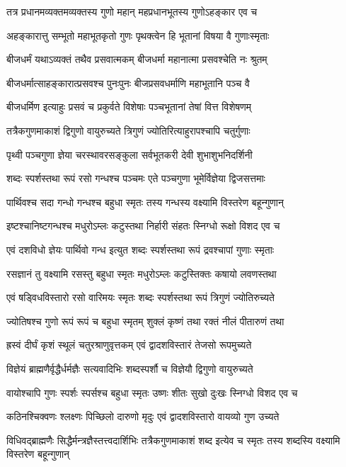 \twolineshloka
{तत्र प्रधानमव्यक्तमव्यक्तस्य गुणो महान्}
{महप्रधानभूतस्य गुणोऽहङ्कार एव च}


\twolineshloka
{अहङ्कारात्तु सम्भूतो महाभूतकृतो गुणः}
{पृथक्त्वेन हि भूतानां विषया वै गुणाःस्मृताः}


\twolineshloka
{बीजधर्मं यथाऽव्यक्तं तथैव प्रसवात्मकम्}
{बीजधर्मा महानात्मा प्रसवश्चेति नः श्रुतम्}


\twolineshloka
{बीजधर्मात्साहङ्कारात्प्रसवश्च पुनःपुनः}
{बीजप्रसवधर्माणि महाभूतानि पञ्च वै}


\twolineshloka
{बीजधर्मिण इत्याहुः प्रसवं च प्रकुर्वते}
{विशेषाः पञ्चभूतानां तेषां वित्त विशेषणम्}


\twolineshloka
{तत्रैकगुणमाकाशं द्विगुणो वायुरुच्यते}
{त्रिगुणं ज्योतिरित्याहुरापश्चापि चतुर्गुणाः}


\twolineshloka
{पृथ्वी पञ्चगुणा ज्ञेया चरस्थावरसङ्कुला}
{सर्वभूतकरी देवी शुभाशुभनिदर्शिनी}


\twolineshloka
{शब्दः स्पर्शस्तथा रूपं रसो गन्धश्च पञ्चमः}
{एते पञ्चगुणा भूमेर्विज्ञेया द्विजसत्तमाः}


\twolineshloka
{पार्थिवश्च सदा गन्धो गन्धश्च बहुधा स्मृतः}
{तस्य गन्धस्य वक्ष्यामि विस्तरेण बहून्गुणान्}


\twolineshloka
{इष्टश्चानिष्टगन्धश्च मधुरोऽम्लः कटुस्तथा}
{निर्हारी संहतः स्निग्धो रूक्षो विशद एव च}


\twolineshloka
{एवं दशविधो ज्ञेयः पार्थिवो गन्ध इत्युत}
{शब्दः स्पर्शस्तथा रूपं द्रवश्चापां गुणाः स्मृताः}


\twolineshloka
{रसज्ञानं तु वक्ष्यामि रसस्तु बहुधा स्मृतः}
{मधुरोऽम्लः कटुस्तिक्तः कषायो लवणस्तथा}


\twolineshloka
{एवं षड्विधविस्तारो रसो वारिमयः स्मृतः}
{शब्दः स्पर्शस्तथा रूपं त्रिगुणं ज्योतिरुच्यते}


\twolineshloka
{ज्योतिषश्च गुणो रूपं रूपं च बहुधा स्मृतम्}
{शुक्लं कृष्णं तथा रक्तं नीलं पीतारुणं तथा}


\twolineshloka
{ह्रस्वं दीर्घं कृशं स्थूलं चतुरश्राणुवृत्तकम्}
{एवं द्वादशविस्तारं तेजसो रूपमुच्यते}


\twolineshloka
{विज्ञेयं ब्राह्मणैर्वृद्धैर्धर्मज्ञैः सत्यवादिभिः}
{शब्दस्पर्शौ च विज्ञेयौ द्विगुणो वायुरुच्यते}


\twolineshloka
{वायोश्चापि गुणः स्पर्शः स्पर्सश्च बहुधा स्मृतः}
{उष्णः शीतः सुखो दुःखः स्निग्धो विशद एव च}


\twolineshloka
{कठिनश्चिक्वणः श्लक्ष्णः पिच्छिलो दारुणो मृदुः}
{एवं द्वादशविस्तारो वायव्यो गुण उच्यते}


विधिवद्ब्राह्मणैः सिद्धैर्मन्त्रज्ञैस्तत्त्वदार्शिभिः
\twolineshloka
{तत्रैकगुणमाकाशं शब्द इत्येव च स्मृतः}
{तस्य शब्दस्यि वक्ष्यामि विस्तरेण बहून्गुणान्}


